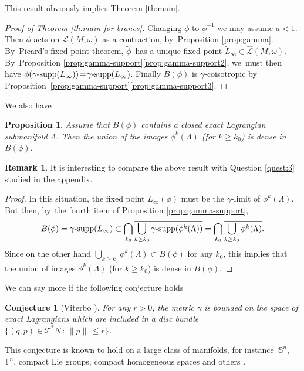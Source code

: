 \documentclass[10pt]{amsart}
\newtheorem{prop}[thm]{Proposition}
\newtheorem{Conjecture}[thm]{Conjecture}
\theoremstyle{definition}
\newtheorem{rem}[thm]{Remark}
\newcommand {\LL}{{\mathcal L}}
\newcommand{\T}{{\mathcal T}}
\DeclareMathOperator{\gammasupp}{\gamma\textup{-supp}}
\newcommand{\hatLL}{\widehat{\LL}}
\begin{document}
This result obviously implies Theorem \ref{th:main}.

\begin{proof}[Proof of Theorem \ref{th:main-for-branes}]
Changing $\phi$ to $\phi^{-1}$ we may assume $a<1$. Then $\tilde\phi$ acts on $\LL(M, \omega)$ as a contraction, by~Proposition \ref{prop:gamma}. By~Picard's fixed point theorem, $\tilde\phi$~has a unique fixed point $\tilde L_\infty \in
\hatLL(M, \omega)$. By~Proposition \ref{prop:gamma-support}\eqref{prop:gamma-support2}, we~must then have
$\phi(\gammasupp(L_\infty))\!=\! \gammasupp(L_\infty)$. Finally $B(\phi)$ is $\gamma$\nobreakdash-coisotropic by Proposition~\ref{prop:gamma-support}\eqref{prop:gamma-support3}.
\end{proof}

We also have
\begin{prop} \label{prop:lagrangian-in-B}
Assume that $B(\phi)$ contains a closed exact Lagrangian
submanifold $\Lambda$. Then the union of the images $\phi^k(\Lambda)$
(for $k\geq k_0$) is dense in $B(\phi)$.
\end{prop}

\begin{rem}
It is interesting to compare the above result with Question \ref{quest:3} studied in the appendix.
\end{rem}

\begin{proof} In this situation, the fixed point $L_\infty(\phi)$ must be the $\gamma$\nobreakdash-limit of $\phi^k(\Lambda)$. But then, by~the fourth item of Proposition \ref{prop:gamma-support},
\[
B(\phi)=\gammasupp(L_\infty)\subset
\bigcap_{k_0}\overline{\bigcup_{k\geq k_0} \gammasupp(\phi^k(\Lambda))}= \bigcap_{k_0}\overline{\bigcup_{k\geq k_0}\phi^k(\Lambda)}.
\]
Since on the other hand $\bigcup_{k\geq k_0}\phi^k(\Lambda)\subset B(\phi)$ for any $k_0$, this implies that the union of images $\phi^k(\Lambda)$ (for $k\geq k_0$) is dense in $B(\phi)$.
\end{proof}

We can say more if the following conjecture holds

\begin{Conjecture}[Viterbo \cite{SHT}]\label{conj-bounded-Lagrangian}
For any $r>0$, the metric $\gamma$ is bounded on the space of exact Lagrangians which are included in a disc bundle \hbox{$\{(q,p)\!\in\!\T^*N\,{:}\,\|p\|\,\leq\!r\}$}.
\end{Conjecture}

This conjecture is known to hold on a large class of manifolds, for instance~$\mathbb S^n$,~$\mathbb T^n$, compact Lie groups, compact homogeneous spaces and others \cite{Shelukhin-Zoll,shelukhin-sc-viterbo,Guillermou-Vichery, Viterbo-inverse-reduction}.
\end{document}
